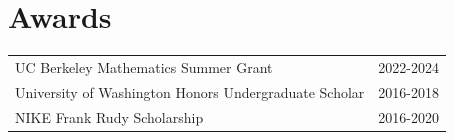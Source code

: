 
\section{\sc Awards}
\begin{tabular}{@{}p{3.55in}p{1.25in}}
UC Berkeley Mathematics Summer Grant & 2022-2024 \\
University of Washington Honors Undergraduate Scholar & 2016-2018\\
NIKE Frank Rudy Scholarship & 2016-2020 \\
\end{tabular}
\endinput
